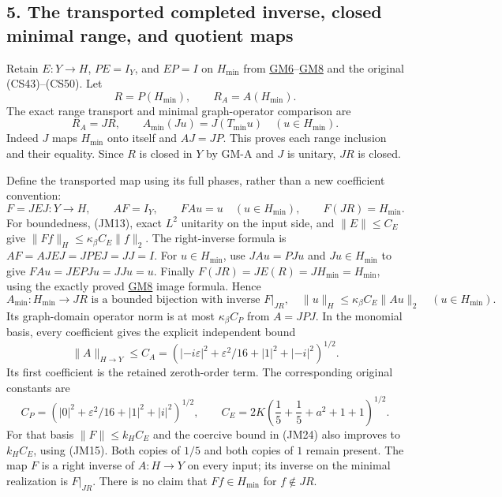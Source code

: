 \documentclass[
  11pt,
]{article}
\begin{document}
\subsection{5. The transported completed inverse, closed minimal range,
and quotient
maps}\label{the-transported-completed-inverse-closed-minimal-range-and-quotient-maps}

Retain \(E:Y\to H\), \(PE=I_Y\), and
\(EP=I\) on \(H_{\min}\) from
\href{../u006-graph-domains/graph-domain-note.html\#eq-GM6}{GM6}--\href{../u006-graph-domains/graph-domain-note.html\#eq-GM8}{GM8}
and the original (CS43)--(CS50). Let \[
 R=P(H_{\min}),\qquad R_A=A(H_{\min}).
\] The exact
range transport and minimal graph-operator comparison are
\[
 R_A=JR,\qquad
 A_{\min}(Ju)=J(T_{\min}u)\quad(u\in H_{\min}).
 \tag{JM22}
\] Indeed \(J\) maps
\(H_{\min}\) onto itself and \(AJ=JP\). This
proves each range inclusion and their equality. Since
\(R\) is closed in \(Y\) by GM-A and
\(J\) is unitary, \(JR\) is closed.

Define the transported map using its full phases, rather than a new
coefficient convention: \[
 F=JEJ:Y\longrightarrow H,\qquad
 AF=I_Y,\qquad
 FAu=u\quad(u\in H_{\min}),\qquad
 F(JR)=H_{\min}.
 \tag{JM23}
\] For boundedness, (JM13),
exact \(L^2\) unitarity on the input side, and
\(\|E\|\leq C_E\) give \(\|Ff\|_H\leq\kappa_\beta C_E\|f\|_2\). The right-inverse
formula is \(AF=AJEJ=JPEJ=JJ=I\). For \(u\in H_{\min}\), use
\(JAu=PJu\) and \(Ju\in H_{\min}\) to give
\(FAu=JEPJu=JJu=u\). Finally \(F(JR)=JE(R)=JH_{\min}=H_{\min}\), using the
exactly proved
\href{../u006-graph-domains/graph-domain-note.html\#eq-GM8}{GM8} image
formula. Hence \[
 A_{\min}:H_{\min}\longrightarrow JR
       \text{ is a bounded bijection with inverse }F|_{JR},
 \quad
 \|u\|_H\leq\kappa_\beta C_E\|Au\|_2\quad(u\in H_{\min}).
 \tag{JM24}
\] Its graph-domain operator norm is
at most \(\kappa_\beta C_P\) from \(A=JPJ\). In the
monomial basis, every coefficient gives the explicit independent bound
\[
 \|A\|_{H\to Y}
   \leq C_A=\left(|-i\varepsilon|^2+
                     \varepsilon^2/16+|1|^2+|-i|^2\right)^{1/2}.
\] Its first coefficient is the retained
zeroth-order term. The corresponding original constants are
\[
 C_P=\left(|0|^2+\varepsilon^2/16+|1|^2+|i|^2\right)^{1/2},
 \qquad
 C_E=2K\left(\frac15+\frac15+a^2+1+1\right)^{1/2}.
\] For that basis \(\|F\|\leq k_H C_E\) and the
coercive bound in (JM24) also improves to \(k_H C_E\), using
(JM15). Both copies of \(1/5\) and both copies of
\(1\) remain present. The map \(F\)
is a right inverse of \(A:H\to Y\) on every input; its
inverse on the minimal realization is \(F|_{JR}\). There is
no claim that \(Ff\in H_{\min}\) for \(f\notin JR\).
\end{document}
